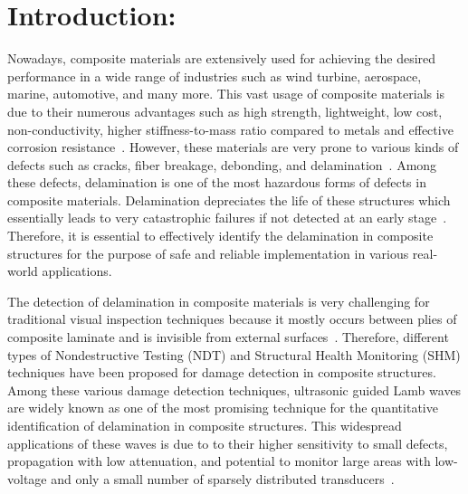 \section{Introduction:}

Nowadays, composite materials are extensively used for achieving the desired performance in a wide range of industries such as wind turbine, aerospace, marine, automotive, and many more.
This vast usage of composite materials is due to their numerous advantages such as high strength, lightweight, low cost, non-conductivity, higher stiffness-to-mass ratio compared to metals and effective corrosion resistance~\cite{baker2004composite, giurgiutiu2015structural, stoik2010nondestructive, poudel2015comparison}. 
However, these materials are very prone to various kinds of defects such as cracks, fiber breakage, debonding, and delamination~\cite{poudel2015comparison, heslehurst2014defects, talreja2012damage}.
Among these defects, delamination is one of the most hazardous forms of defects in composite materials. 
Delamination depreciates the life of these structures which essentially leads to very catastrophic failures if not detected at an early stage~\cite{talreja2012damage, wisnom2012role}.
Therefore, it is essential to effectively identify the delamination
in composite structures for the purpose of safe and reliable implementation in
various real-world applications.

The detection of delamination in composite materials is very challenging for traditional visual inspection techniques because it mostly occurs between plies of composite laminate and is invisible from external surfaces~\cite{guinard20023d, staszewski2009health, tuo2019damage}.
Therefore, different types of Nondestructive Testing (NDT) and Structural Health Monitoring (SHM) techniques have been proposed for damage detection in composite structures.
Among these various damage detection techniques, ultrasonic guided Lamb waves are widely known as one of the most promising technique for the quantitative identification of delamination in composite structures.
This widespread applications of these waves is due to to their higher sensitivity to small defects, propagation with low attenuation, and potential to monitor large areas with low-voltage and only a small number of sparsely distributed transducers~\cite{alleyne1992interaction, mitra2016guided, giurgiutiu2003lamb, ihn2008pitch}.

